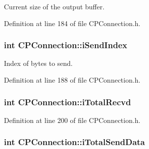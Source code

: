 \-Current size of the output buffer. 



\-Definition at line 184 of file \-C\-P\-Connection.\-h.

\hypertarget{class_c_p_connection_aaac2a186e16efdb9f7786cc46dd81125}{
\subsubsection[{i\-Send\-Index}]{\setlength{\rightskip}{0pt plus 5cm}int {\bf \-C\-P\-Connection\-::i\-Send\-Index}}}\label{class_c_p_connection_aaac2a186e16efdb9f7786cc46dd81125}


\-Index of bytes to send. 



\-Definition at line 188 of file \-C\-P\-Connection.\-h.

\hypertarget{class_c_p_connection_ad7ed8001aa54d09e57ce0fb19229d9c8}{
\subsubsection[{i\-Total\-Recvd}]{\setlength{\rightskip}{0pt plus 5cm}int {\bf \-C\-P\-Connection\-::i\-Total\-Recvd}}}\label{class_c_p_connection_ad7ed8001aa54d09e57ce0fb19229d9c8}


\-Definition at line 200 of file \-C\-P\-Connection.\-h.

\hypertarget{class_c_p_connection_a1fb64ea875ecc8bc912bafd308294bf1}{
\subsubsection[{i\-Total\-Send\-Data}]{\setlength{\rightskip}{0pt plus 5cm}int {\bf \-C\-P\-Connection\-::i\-Total\-Send\-Data}}}\label{class_c_p_connection_a1fb64ea875ecc8bc912bafd308294bf1}


